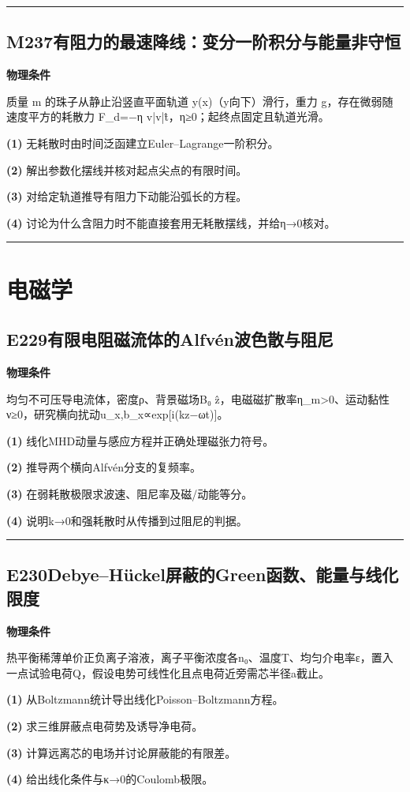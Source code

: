 \documentclass[UTF8,a4paper,11pt,oneside,openany]{ctexbook}
\begin{document}
\par\bigskip\hrule\bigskip
\section*{M237\quad 有阻力的最速降线：变分一阶积分与能量非守恒}
\textbf{物理条件}\par 质量 m 的珠子从静止沿竖直平面轨道 y(x)（y向下）滑行，重力 g，存在微弱随速度平方的耗散力 F\_d=−η v|v|t̂，η≥0；起终点固定且轨道光滑。
\par\noindent\textbf{(1)} 无耗散时由时间泛函建立Euler–Lagrange一阶积分。
\par\noindent\textbf{(2)} 解出参数化摆线并核对起点尖点的有限时间。
\par\noindent\textbf{(3)} 对给定轨道推导有阻力下动能沿弧长的方程。
\par\noindent\textbf{(4)} 讨论为什么含阻力时不能直接套用无耗散摆线，并给η→0核对。

\par\bigskip\hrule\bigskip
\chapter{电磁学}
\section*{E229\quad 有限电阻磁流体的Alfvén波色散与阻尼}
\textbf{物理条件}\par 均匀不可压导电流体，密度ρ、背景磁场B₀ ẑ，电磁磁扩散率η\_m>0、运动黏性ν≥0，研究横向扰动u\_x,b\_x∝exp[i(kz−ωt)]。
\par\noindent\textbf{(1)} 线化MHD动量与感应方程并正确处理磁张力符号。
\par\noindent\textbf{(2)} 推导两个横向Alfvén分支的复频率。
\par\noindent\textbf{(3)} 在弱耗散极限求波速、阻尼率及磁/动能等分。
\par\noindent\textbf{(4)} 说明k→0和强耗散时从传播到过阻尼的判据。

\par\bigskip\hrule\bigskip
\section*{E230\quad Debye–Hückel屏蔽的Green函数、能量与线化限度}
\textbf{物理条件}\par 热平衡稀薄单价正负离子溶液，离子平衡浓度各n₀、温度T、均匀介电率ε，置入一点试验电荷Q，假设电势可线性化且点电荷近旁需芯半径a截止。
\par\noindent\textbf{(1)} 从Boltzmann统计导出线化Poisson–Boltzmann方程。
\par\noindent\textbf{(2)} 求三维屏蔽点电荷势及诱导净电荷。
\par\noindent\textbf{(3)} 计算远离芯的电场并讨论屏蔽能的有限差。
\par\noindent\textbf{(4)} 给出线化条件与κ→0的Coulomb极限。
\end{document}

